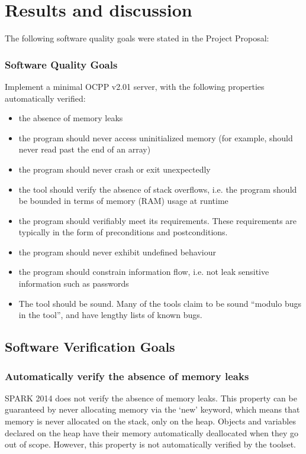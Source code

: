\documentclass[12pt,openany,a4paper]{book}
\begin{document}
\chapter{Results and discussion}
The following software quality goals were stated in the Project Proposal:
\subsection {Software Quality Goals}
Implement a minimal OCPP v2.01 server, with the following properties automatically verified:
\begin{itemize}
	\item the absence of memory leaks
	\item the program should never access uninitialized memory (for example, should never read past the end of an array)
	\item the program should never crash or exit unexpectedly
	\item the tool should verify the absence of stack overflows, i.e. the program should be bounded in terms of memory (RAM) usage at runtime
	\item the program should verifiably meet its requirements. These requirements are typically in the form of preconditions and postconditions.
	\item the program should never exhibit undefined behaviour
	\item the program should constrain information flow, i.e. not leak sensitive information such as passwords
	\item The tool should be sound. Many of the tools claim to be sound ``modulo bugs in the tool'', and have lengthy lists of known bugs.
\end{itemize}


\section{Software Verification Goals}
\subsection{Automatically verify the absence of memory leaks}
SPARK 2014 does not verify the absence of memory leaks. This property can be guaranteed by never allocating memory via the `new' keyword, which means that memory is never allocated on the stack, only on the heap. Objects and variables declared on the heap have their memory automatically deallocated when they go out of scope. However, this property is not automatically verified by the toolset.
\end{document}
